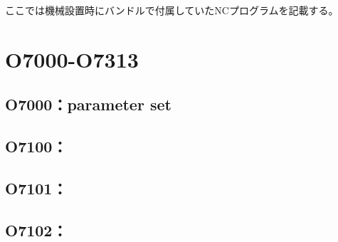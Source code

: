 
ここでは機械設置時にバンドルで付属していたNCプログラムを記載する。


\section{O7000-O7313}

\subsection{O7000：parameter set}



\clearpage
\subsection{O7100：}



\subsection{O7101：}



\clearpage
\subsection{O7102：}




